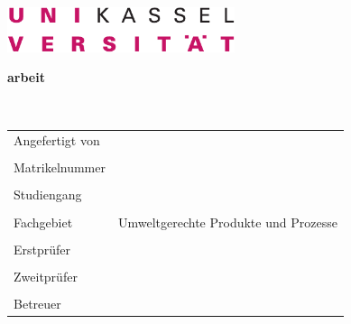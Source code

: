 \clearpage
\thispagestyle{empty}

\includegraphics[width=0.5\textwidth]{gfx/logo_universitaet_CMYK.pdf} \\ 
\begin{flushleft}
	\vskip 1cm

	\vspace*{3cm}
	{\textbf{{\huge \thesistype arbeit}}} \\ 
	\vspace{2.5cm}
		\begin{spacing}{2.5}
			{\textbf{{\Large \thesistitle}}}       \\ 
		\end{spacing} 
        \vspace{1.5cm}

	\begin{table}[ht]
	\hspace{-0.3cm}
		\begin{tabular}{@{}ll}
				Angefertigt von 	& \vornamenachname \\
													&	\\
				Matrikelnummer 		& \matrikelnummer \\
													&	\\
				Studiengang 			& \studiengang \\
													& \\
				Fachgebiet 				& Umweltgerechte Produkte und Prozesse \\
													& \\
				Erstpr\"ufer 			& \erstpruefer \\
													& \\
				Zweitpr\"ufer 		& \zweitpruefer \\
													& \\
				Betreuer					&	\erstbetreuer \\
		\end{tabular}
	\end{table}
\end{flushleft}


